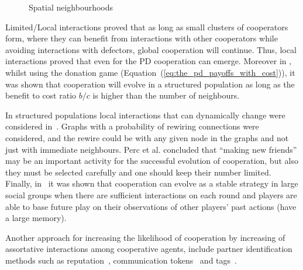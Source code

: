 \begin{figure}[!hbtp]
    \centering
        \begin{subfigure}{.25\textwidth}
            
        \end{subfigure}
        \begin{subfigure}{.25\textwidth}\centering
            
         \end{subfigure}
         \begin{subfigure}{.25\textwidth}\centering
            
         \end{subfigure}
         \caption{Spatial neighbourhoods}\label{fig:topologies}
\end{figure}

Limited/Local interactions proved that as long as small clusters of cooperators form, where
they can benefit from interactions with other cooperators while avoiding
interactions with defectors, global cooperation will continue. Thus, local
interactions proved that even for the PD cooperation can emerge. Moreover in
\cite{Ohtsuki2006}, whilst using the donation game
(Equation~(\ref{eq:the_pd_payoffs_with_cost})), it was shown that cooperation will
evolve in a structured population as long as the benefit to cost ratio \(b / c\)
is higher than the number of neighbours.

In structured populations local interactions that can dynamically change were
considered in~\cite{Perc2011}. Graphs with a probability of rewiring 
connections were considered, and the rewire could be with any given node in the
graphs and not just with immediate neighbours. Perc et al. concluded that
``making new friends'' may be an important activity for the successful evolution
of cooperation, but also they must be selected carefully and one should keep
their number limited. Finally, in~\cite{Cox1999} it was shown that cooperation
can evolve as a stable strategy in large social groups when there are sufficient
interactions on each round and players are able to base future play on their
observations of other players' past actions (have a large memory).

Another approach for increasing the likelihood of cooperation by increasing of
assortative interactions among cooperative agents, include partner identification
methods such as reputation~\cite{Janssen2006, Nowak1998, Suzuki2005},
communication tokens~\cite{Miller2002} and tags~\cite{Choi2006, Hales2000,
Miller2002, Riolo2001}.

